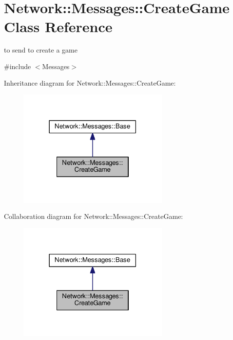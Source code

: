\hypertarget{class_network_1_1_messages_1_1_create_game}{}\section{Network\+:\+:Messages\+:\+:Create\+Game Class Reference}
\label{class_network_1_1_messages_1_1_create_game}


to send to create a game  




{\ttfamily \#include $<$Messages$>$}



Inheritance diagram for Network\+:\+:Messages\+:\+:Create\+Game\+:
\nopagebreak
\begin{figure}[H]
\begin{center}
\leavevmode
\includegraphics[width=213pt]{class_network_1_1_messages_1_1_create_game__inherit__graph}
\end{center}
\end{figure}


Collaboration diagram for Network\+:\+:Messages\+:\+:Create\+Game\+:
\nopagebreak
\begin{figure}[H]
\begin{center}
\leavevmode
\includegraphics[width=213pt]{class_network_1_1_messages_1_1_create_game__coll__graph}
\end{center}
\end{figure}
